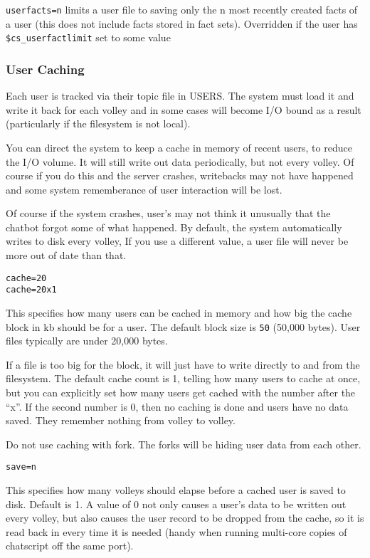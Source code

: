 \documentclass[]{article}
\begin{document}
\texttt{userfacts=n} limits a user file to saving only the n most
recently created facts of a user (this does not include facts stored in
fact sets). Overridden if the user has \texttt{\$cs\_userfactlimit} set
to some value

\subsubsection{User Caching}\label{user-caching}

Each user is tracked via their topic file in USERS. The system must load
it and write it back for each volley and in some cases will become I/O
bound as a result (particularly if the filesystem is not local).

You can direct the system to keep a cache in memory of recent users, to
reduce the I/O volume. It will still write out data periodically, but
not every volley. Of course if you do this and the server crashes,
writebacks may not have happened and some system rememberance of user
interaction will be lost.

Of course if the system crashes, user's may not think it unusually that
the chatbot forgot some of what happened. By default, the system
automatically writes to disk every volley, If you use a different value,
a user file will never be more out of date than that.

\begin{verbatim}
cache=20
cache=20x1
\end{verbatim}

This specifies how many users can be cached in memory and how big the
cache block in kb should be for a user. The default block size is
\texttt{50} (50,000 bytes). User files typically are under 20,000 bytes.

If a file is too big for the block, it will just have to write directly
to and from the filesystem. The default cache count is 1, telling how
many users to cache at once, but you can explicitly set how many users
get cached with the number after the ``x''. If the second number is 0,
then no caching is done and users have no data saved. They remember
nothing from volley to volley.

Do not use caching with fork. The forks will be hiding user data from
each other.

\begin{verbatim}
save=n
\end{verbatim}

This specifies how many volleys should elapse before a cached user is
saved to disk. Default is 1. A value of 0 not only causes a user's data
to be written out every volley, but also causes the user record to be
dropped from the cache, so it is read back in every time it is needed
(handy when running multi-core copies of chatscript off the same port).
\end{document}
